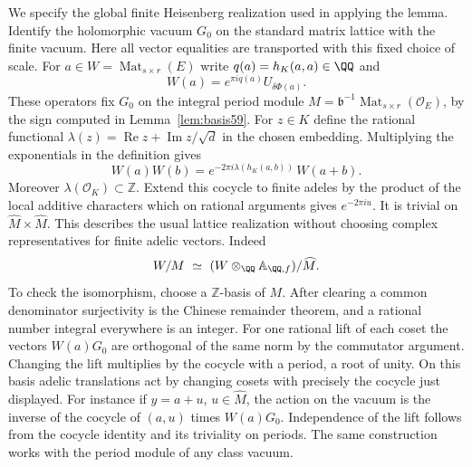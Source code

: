 \documentclass[a4paper,11pt]{article}
\theoremstyle{definition}
\theoremstyle{remark}
\newcommand{\ZZ}{\mathbb Z}\newcommand{\ord}{\operatorname{ord}}
\newcommand{\real}{\operatorname{Re}}\newcommand{\imag}{\operatorname{Im}}
\numberwithin{equation}{section}
\newcommand{\OO}{\mathcal O}
\begin{document}
We specify the global finite Heisenberg realization used in applying
the lemma. Identify the holomorphic vacuum \(G_0\) on the standard
matrix lattice with the finite vacuum. Here all vector equalities
are transported with this fixed choice of scale. For
\(a\in W=\operatorname{Mat}_{s\times r}(E)\) write
\(q(a)=h_K(a,a)\in\QQ\) and
\[
       W(a)=e^{\pi i q(a)}U_{\delta\Phi(a)} .
\]
These operators fix \(G_0\) on the integral period module
\(M=\mathfrak b^{-1}\operatorname{Mat}_{s\times r}(\OO_E)\),
by the sign computed in Lemma~\ref{lem:basis59}. For
\(z\in K\) define the rational functional
\(\lambda(z)=\real z+\imag z/\sqrt d\) in the chosen embedding.
Multiplying the exponentials in the definition gives
\[
 W(a)W(b)=e^{-2\pi i\lambda(h_K(a,b))}\,W(a+b).
\]
Moreover \(\lambda(\OO_K)\subset\ZZ\). Extend this cocycle to
finite adeles by the product of the local additive characters
which on rational arguments gives \(e^{-2\pi i u}\). It is
trivial on \(\widehat M\times\widehat M\). This describes the
usual lattice realization without choosing complex
representatives for finite adelic vectors. Indeed
\[
             W/M \ \simeq\ (W\otimes_\QQ\mathbb A_{\QQ,f})/\widehat M .
\]
To check the isomorphism, choose a \(\ZZ\)-basis of \(M\).
After clearing a common denominator surjectivity is the Chinese
remainder theorem, and a rational number integral everywhere
is an integer. For one rational lift of each coset the vectors
\(W(a)G_0\) are orthogonal of the same norm by the commutator
argument. Changing the lift multiplies by the cocycle with a
period, a root of unity. On this basis adelic translations act
by changing cosets with precisely the cocycle just displayed.
For instance if \(y=a+u\), \(u\in\widehat M\), the action on
the vacuum is the inverse of the cocycle of \((a,u)\) times
\(W(a)G_0\). Independence of the lift follows from the cocycle
identity and its triviality on periods. The same construction
works with the period module of any class vacuum.
\end{document}
